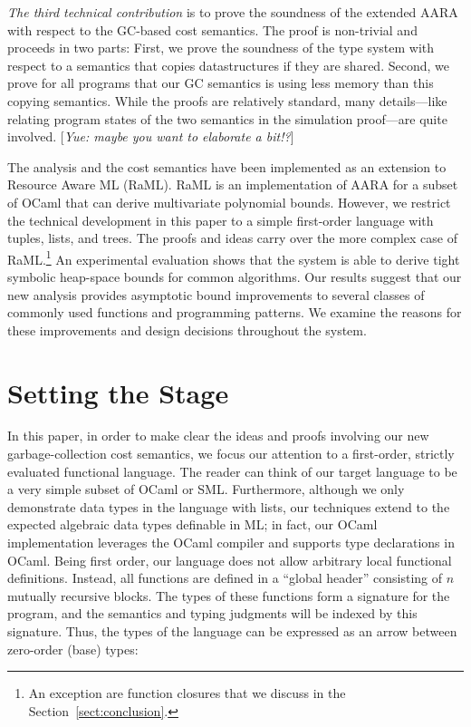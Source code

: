 \documentclass{easychair}
\newcommand{\yue}[1]{{\color{blue} [\emph{Yue: #1}]}}
\theoremstyle{definition}
\begin{document}
\emph{The third technical contribution} is to prove the soundness of
the extended AARA with respect to the GC-based cost semantics. The
proof is non-trivial and proceeds in two parts: First, we prove the
soundness of the type system with respect to a semantics that copies
datastructures if they are shared. Second, we prove for all programs
that our GC semantics is using less memory than this copying
semantics. While the proofs are relatively standard, many
details---like relating program states of the two semantics in the
simulation proof---are quite involved. \yue{maybe you want to
  elaborate a bit!?}

The analysis and the cost semantics have been implemented as an
extension to Resource Aware ML (RaML). RaML is an implementation of
AARA for a subset of OCaml that can derive multivariate polynomial
bounds. However, we restrict the technical development in this paper
to a simple first-order language with tuples, lists, and trees. The
proofs and ideas carry over the more complex case of
RaML.\footnote{An exception are function closures that we discuss in
  the Section~\ref{sect:conclusion}.}
%
An experimental evaluation shows that the system is able to derive
tight symbolic heap-space bounds for common algorithms. Our results
suggest that our new analysis provides asymptotic bound improvements
to several classes of commonly used functions and programming
patterns. We examine the reasons for these improvements and design
decisions throughout the system.



\section{Setting the Stage}
\label{sect:fop}

In this paper, in order to make clear the ideas and proofs involving our new garbage-collection 
cost semantics, we focus our attention to a first-order, 
strictly evaluated functional language. 
The reader can think of our target language to be a very simple subset of OCaml or SML. 
Furthermore, although we only demonstrate data types in the language with lists, 
our techniques extend to the expected algebraic data types definable in ML; in fact, 
our OCaml implementation leverages the OCaml compiler and supports type declarations in OCaml. 
Being first order, our language does not allow arbitrary local functional definitions. Instead,
all functions are defined in a ``global header'' consisting of $n$ mutually recursive blocks. 
The types of these functions form a signature for the program, and the semantics and typing 
judgments will be indexed by this signature. Thus, the types of the language can be expressed 
as an arrow between zero-order (base)  types: \\
\end{document}
